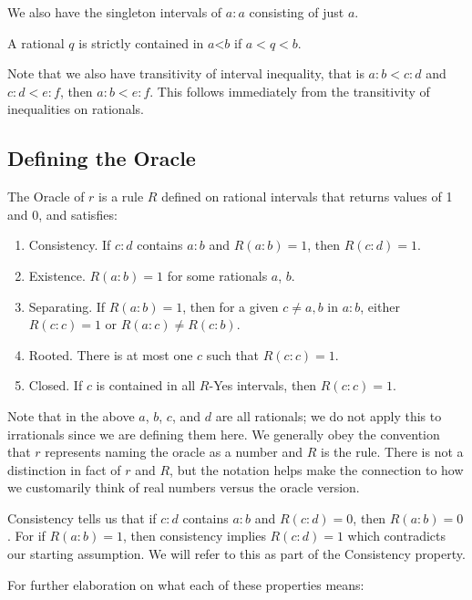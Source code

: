 \documentclass[12pt]{article}
\theoremstyle{remark}
\newcommand{\lt}{\mathord{<}}
\begin{document}
We also have the singleton intervals of $a:a$ consisting of just $a$. 

A rational $q$ is strictly contained in $a\lt b$ if $a < q < b$. 

Note that we also have transitivity of interval inequality, that is $a:b < c:d$ and $c:d < e:f$, then $a:b < e:f$. This follows immediately from the transitivity of inequalities on rationals.

\subsection{Defining the Oracle}

The Oracle of $r$ is a rule $R$ defined on rational intervals that returns values of 1 and 0, and satisfies: 
\begin{enumerate}
    \item Consistency. If $c:d$ contains $a:b$ and $R(a:b) = 1$, then $R(c:d) = 1$.
    \item Existence. $R(a:b) = 1$ for some rationals $a$, $b$.
    \item Separating. If $R(a:b)=1$, then for a given $c \neq a, b$ in $a:b$, either $R(c:c) = 1$ or $R(a:c) \neq R(c:b)$. 
    \item Rooted. There is at most one $c$ such that $R(c:c) =1$.
    \item Closed. If $c$ is contained in all $R$-Yes intervals, then $R(c:c) = 1$.
\end{enumerate}

Note that in the above $a$, $b$, $c$, and $d$ are all rationals; we do not apply this to irrationals since we are defining them here. We generally obey the convention that $r$ represents naming the oracle as a number and $R$ is the rule. There is not a distinction in fact of $r$ and $R$, but the notation helps make the connection to how we customarily think of real numbers versus the oracle version. 

Consistency tells us that if $c:d$ contains $a:b$ and $R(c:d) = 0$, then $R(a:b) = 0$. For if $R(a:b)=1$, then consistency implies $R(c:d)=1$ which contradicts our starting assumption. We will refer to this as part of the Consistency property. 

For further elaboration on what each of these properties means:
\end{document}
